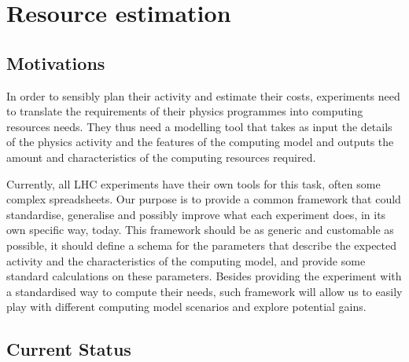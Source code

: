 \section{Resource estimation}

\subsection{Motivations}

In order to sensibly plan their activity and estimate their costs,
experiments need to translate the requirements of their physics
programmes into computing resources needs. They thus need a modelling
tool that takes as input the details of the physics activity
and the features of the computing model 
and outputs the amount and characteristics of the computing resources
required.

Currently, all LHC experiments have their own tools for this task,
often some complex spreadsheets. Our purpose is to provide a common
framework that could standardise, generalise and possibly improve what
each experiment does, in its own specific way, today. This framework
should be as generic and customable as possible, it should define a
schema for the parameters that describe the expected activity and the
characteristics of the computing model, and provide some standard
calculations on these parameters.  Besides providing the experiment
with a standardised way to compute their needs, such framework will
allow us to easily play with different computing model scenarios and
explore potential gains.

\subsection{Current Status}

